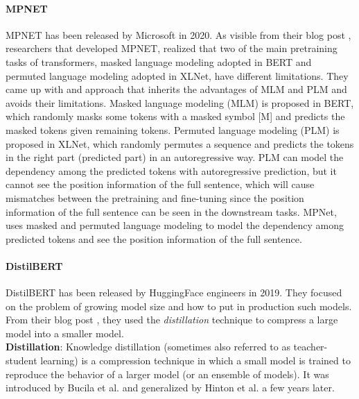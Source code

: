\documentclass[\main/main.tex]{subfiles}
\begin{document}
\paragraph{MPNET}
MPNET has been released by Microsoft in 2020. As visible from their blog post \cite{mpnet_blog_post},  researchers that developed MPNET, realized that two of the main pretraining tasks of transformers, masked language modeling adopted in BERT and permuted language modeling adopted in XLNet, have different limitations. They came up with and approach that inherits the advantages of MLM and PLM and avoids their limitations. Masked language modeling (MLM) is proposed in BERT, which randomly masks some tokens with a masked symbol [M] and predicts the masked tokens given remaining tokens. Permuted language modeling (PLM) is proposed in XLNet, which randomly permutes a sequence and predicts the tokens in the right part (predicted part) in an autoregressive way. PLM can model the dependency among the predicted tokens with autoregressive prediction, but it cannot see the position information of the full sentence, which will cause mismatches between the pretraining and fine-tuning since the position information of the full sentence can be seen in the downstream tasks. MPNet, uses masked and permuted language modeling to model the dependency among predicted tokens and see the position information of the full sentence\cite{DBLP:journals/corr/abs-2004-09297}.
\paragraph{DistilBERT}
DistilBERT has been released by HuggingFace engineers in 2019. They focused on the problem of growing model size and how to put in production such models. From their blog post \cite{distilbert_blog_post}, they used the \emph{distillation} technique to compress a large model into a smaller model.\\
\textbf{Distillation}: Knowledge distillation (sometimes also referred to as teacher-student learning) is a compression technique in which a small model is trained to reproduce the behavior of a larger model (or an ensemble of models). It was introduced by Bucila et al.\cite{10.1145/1150402.1150464} and generalized by Hinton et al.\cite{hinton2015distilling} a few years later\cite{DBLP:journals/corr/abs-1910-01108}.
\end{document}
